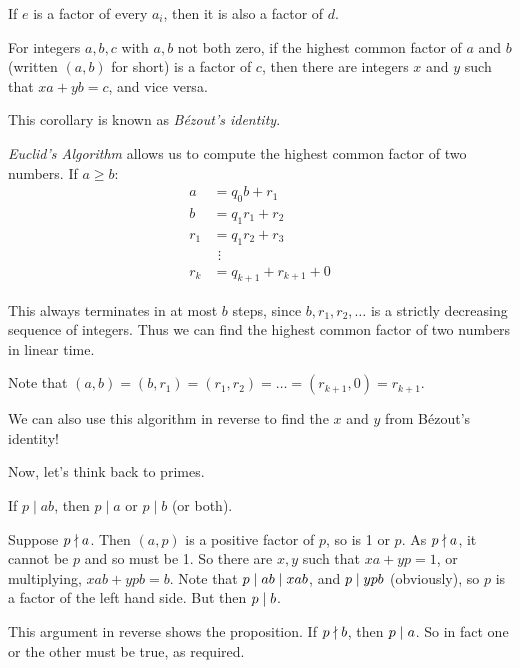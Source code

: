 \documentclass{article}
\begin{document}
\begin{corollary}
	If $e$ is a factor of every $a_i$, then it is also a factor of $d$. 
\end{corollary}

\begin{corollary}
	For integers $a, b, c$ with $a, b$ not both zero, if the highest common factor of $a$ and $b$ (written $(a, b)$ for short) is a factor of $c$, then there are integers $x$ and $y$ such that $xa + yb = c$, and vice versa.
\end{corollary}

This corollary is known as \textit{B\'ezout's identity}.

\begin{remark}
	\label{euclids-algorithm}
	\textit{Euclid's Algorithm} allows us to compute the highest common factor of two numbers. If $a \geq b$:
	\begin{align*}
		a &= q_0 b + r_1 \\
		b &= q_1 r_1 + r_2 \\
		r_1 &= q_1 r_2 + r_3 \\
		& \,\ \vdots \\
		r_k &= q_{k+1} + r_{k+1} + 0
	\end{align*}
	
	This always terminates in at most $b$ steps, since $b, r_1, r_2, \dots$ is a strictly decreasing sequence of integers.
	Thus we can find the highest common factor of two numbers in linear time.
	
	Note that $(a, b) = (b, r_1) = (r_1, r_2) = \dots = (r_{k+1}, 0) = r_{k+1}$.
	
	We can also use this algorithm in reverse to find the $x$ and $y$ from B\'ezout's identity!
\end{remark}

Now, let's think back to primes.

\begin{proposition}
	If $p \mid ab$, then $p \mid a$ or $p \mid b$ (or both).
\end{proposition}

\begin{prf}
	Suppose $p \nmid a$.
	Then $(a, p)$ is a positive factor of $p$, so is 1 or $p$.
	As $p \nmid a$, it cannot be $p$ and so must be 1.
	So there are $x, y$ such that $xa + yp = 1$, or multiplying, $xab + ypb = b$.
	Note that $p \mid ab \mid xab$, and $p \mid ypb$ (obviously),
	so $p$ is a factor of the left hand side.
	But then $p \mid b$.
	
	This argument in reverse shows the proposition. If $p \nmid b$, then $p \mid a$. So in fact one or the other must be true, as required.
\end{prf}
\end{document}
